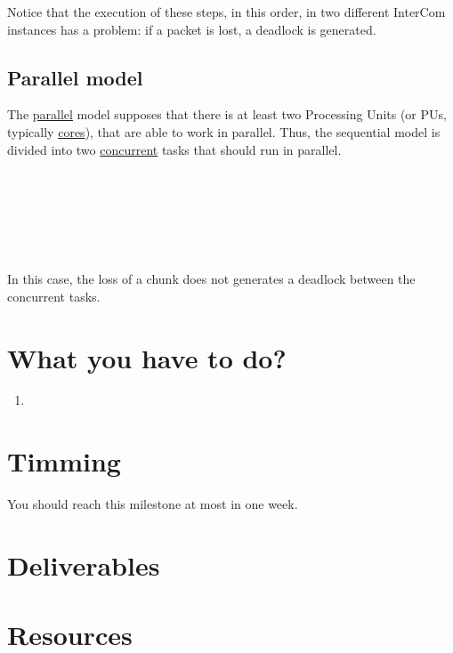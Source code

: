 Notice that the execution of these steps, in this order, in two
different InterCom instances has a problem: if a packet is lost, a
deadlock is generated.

\subsection{Parallel model}

The \href{https://en.wikipedia.org/wiki/Parallel_computing}{parallel}
model supposes that there is at least two Processing Units (or PUs,
typically
\href{https://en.wikipedia.org/wiki/Multi-core_processor}{cores}),
that are able to work in parallel. Thus, the sequential model is
divided into two
\href{https://en.wikipedia.org/wiki/Concurrency_(computer_science)}{concurrent}
tasks that should run in parallel.

\begin{pseudocode}[display]{}{}
  \\
  \BEGIN
     \GETS {}\\
     \GETS {}\\
  \END
  \ENDPROCEDURE
  \BEGIN
     \GETS {}\\
     \GETS {}\\
  \END
\end{pseudocode}

In this case, the loss of a chunk does not generates a deadlock
between the concurrent tasks.

\section{What you have to do?}

\begin{enumerate}

\item
  
\end{enumerate}

\section{Timming}

You should reach this milestone at most in one week.

\section{Deliverables}

\section{Resources}



